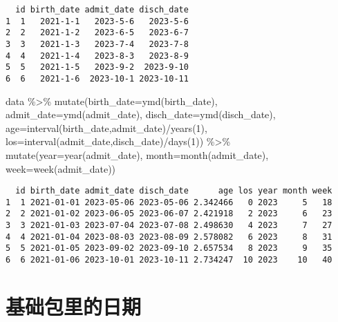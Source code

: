 \documentclass[
  letterpaper,
  DIV=11,
  numbers=noendperiod]{scrreprt}
\newenvironment{Shaded}{\begin{snugshade}}{\end{snugshade}}
\newcommand{\AttributeTok}[1]{\textcolor[rgb]{0.40,0.45,0.13}{#1}}
\newcommand{\DecValTok}[1]{\textcolor[rgb]{0.68,0.00,0.00}{#1}}
\newcommand{\FunctionTok}[1]{\textcolor[rgb]{0.28,0.35,0.67}{#1}}
\newcommand{\NormalTok}[1]{\textcolor[rgb]{0.00,0.23,0.31}{#1}}
\newcommand{\SpecialCharTok}[1]{\textcolor[rgb]{0.37,0.37,0.37}{#1}}
\begin{document}
\begin{verbatim}
  id birth_date admit_date disch_date
1  1   2021-1-1   2023-5-6   2023-5-6
2  2   2021-1-2   2023-6-5   2023-6-7
3  3   2021-1-3   2023-7-4   2023-7-8
4  4   2021-1-4   2023-8-3   2023-8-9
5  5   2021-1-5   2023-9-2  2023-9-10
6  6   2021-1-6  2023-10-1 2023-10-11
\end{verbatim}

\begin{Shaded}
\begin{Highlighting}[]
\NormalTok{data }\SpecialCharTok{\%\textgreater{}\%}
  \FunctionTok{mutate}\NormalTok{(}\AttributeTok{birth\_date=}\FunctionTok{ymd}\NormalTok{(birth\_date),}
         \AttributeTok{admit\_date=}\FunctionTok{ymd}\NormalTok{(admit\_date),}
         \AttributeTok{disch\_date=}\FunctionTok{ymd}\NormalTok{(disch\_date),}
         \AttributeTok{age=}\FunctionTok{interval}\NormalTok{(birth\_date,admit\_date)}\SpecialCharTok{/}\FunctionTok{years}\NormalTok{(}\DecValTok{1}\NormalTok{),}
         \AttributeTok{los=}\FunctionTok{interval}\NormalTok{(admit\_date,disch\_date)}\SpecialCharTok{/}\FunctionTok{days}\NormalTok{(}\DecValTok{1}\NormalTok{)) }\SpecialCharTok{\%\textgreater{}\%}
  \FunctionTok{mutate}\NormalTok{(}\AttributeTok{year=}\FunctionTok{year}\NormalTok{(admit\_date),}
         \AttributeTok{month=}\FunctionTok{month}\NormalTok{(admit\_date),}
         \AttributeTok{week=}\FunctionTok{week}\NormalTok{(admit\_date))}
\end{Highlighting}
\end{Shaded}

\begin{verbatim}
  id birth_date admit_date disch_date      age los year month week
1  1 2021-01-01 2023-05-06 2023-05-06 2.342466   0 2023     5   18
2  2 2021-01-02 2023-06-05 2023-06-07 2.421918   2 2023     6   23
3  3 2021-01-03 2023-07-04 2023-07-08 2.498630   4 2023     7   27
4  4 2021-01-04 2023-08-03 2023-08-09 2.578082   6 2023     8   31
5  5 2021-01-05 2023-09-02 2023-09-10 2.657534   8 2023     9   35
6  6 2021-01-06 2023-10-01 2023-10-11 2.734247  10 2023    10   40
\end{verbatim}

\section{基础包里的日期}\label{ux57faux7840ux5305ux91ccux7684ux65e5ux671f}
\end{document}
